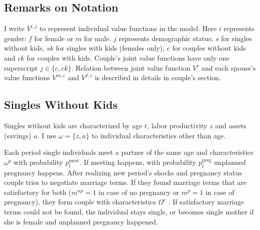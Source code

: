 \subsection{Remarks on Notation}
I write $V^{i,j}$ to represent individual value functions in the model. Here $i$ represents gender: $f$ for female or $m$ for male. $j$ represents demographic status: $s$ for singles without kids, $sk$ for singles with kids (females only), $c$ for couples without kids and $ck$ for couples with kids. Couple's joint value functions have only one superscript $j \in \{c,ck\}$. Relation between joint value function $V^{c}$ and each spouse's value functions $V^{m,c}$ and $V^{f,c}$ is described in details in couple's section.

\subsection{Singles Without Kids}
Singles without kids are characterized by age $t$, labor productivity $z$ and assets (savings) $a$. I use $\omega = \{z,a\}$ to individual characteristics other than age.

Each period single individuals meet a partner of the same age and characteristics $\omega^p$ with probability $p^{\text{meet}}_t$. If meeting happens, with probability $p^{\text{preg}}_t$ unplanned pregnancy happens. After realizing new period's shocks and pregnancy status couple tries to negotiate marriage terms. If they found marriage terms that are satisfactory for both ($m^{np} = 1$ in case of no pregnancy or $m^p = 1$ in case of pregnancy), they form couple with characteristics $\Omega^c$ . If satisfactory marriage terms could not be found, the individual stays single, or becomes single mother if she is female and unplanned pregnancy happened.


